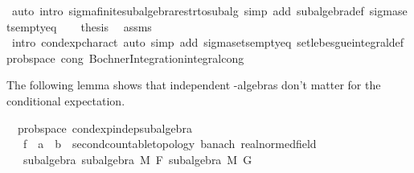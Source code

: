 \begin{isabellebody}
\ {\isacharparenleft}{\kern0pt}auto\ intro{\isacharcolon}{\kern0pt}\ sigma{\isacharunderscore}{\kern0pt}finite{\isacharunderscore}{\kern0pt}subalgebra{\isacharunderscore}{\kern0pt}restr{\isacharunderscore}{\kern0pt}to{\isacharunderscore}{\kern0pt}subalg\ simp\ add{\isacharcolon}{\kern0pt}\ subalgebra{\isacharunderscore}{\kern0pt}def\ sigma{\isacharunderscore}{\kern0pt}sets{\isacharunderscore}{\kern0pt}empty{\isacharunderscore}{\kern0pt}eq{\isacharparenright}{\kern0pt}\isanewline
\ \ \isamarkupfalse%
\ {\isacharquery}{\kern0pt}thesis\ \isamarkupfalse%
\ assms\ \isamarkupfalse%
\ {\isacharparenleft}{\kern0pt}intro\ cond{\isacharunderscore}{\kern0pt}exp{\isacharunderscore}{\kern0pt}charact{\isacharparenright}{\kern0pt}\ {\isacharparenleft}{\kern0pt}auto\ simp\ add{\isacharcolon}{\kern0pt}\ sigma{\isacharunderscore}{\kern0pt}sets{\isacharunderscore}{\kern0pt}empty{\isacharunderscore}{\kern0pt}eq\ set{\isacharunderscore}{\kern0pt}lebesgue{\isacharunderscore}{\kern0pt}integral{\isacharunderscore}{\kern0pt}def\ prob{\isacharunderscore}{\kern0pt}space\ cong{\isacharcolon}{\kern0pt}\ Bochner{\isacharunderscore}{\kern0pt}Integration{\isachardot}{\kern0pt}integral{\isacharunderscore}{\kern0pt}cong{\isacharparenright}{\kern0pt}\isanewline
{}\isamarkupfalse%
%
\endisatagproof
{\isafoldproof}%
%
\isadelimproof
%
\endisadelimproof
%
\begin{isamarkuptext}%
The following lemma shows that independent \isa{{\isasymsigma}}-algebras don't matter for the conditional expectation.%
\end{isamarkuptext}\isamarkuptrue%
\isamarkupfalse%
\ {\isacharparenleft}{\kern0pt}\ prob{\isacharunderscore}{\kern0pt}space{\isacharparenright}{\kern0pt}\ cond{\isacharunderscore}{\kern0pt}exp{\isacharunderscore}{\kern0pt}indep{\isacharunderscore}{\kern0pt}subalgebra{\isacharcolon}{\kern0pt}\isanewline
\ \ \ f\ {\isacharcolon}{\kern0pt}{\isacharcolon}{\kern0pt}\ {\isachardoublequoteopen}{\isacharprime}{\kern0pt}a\ {\isasymRightarrow}\ {\isacharprime}{\kern0pt}b\ {\isacharcolon}{\kern0pt}{\isacharcolon}{\kern0pt}\ {\isacharbraceleft}{\kern0pt}second{\isacharunderscore}{\kern0pt}countable{\isacharunderscore}{\kern0pt}topology{\isacharcomma}{\kern0pt}\ banach{\isacharcomma}{\kern0pt}\ real{\isacharunderscore}{\kern0pt}normed{\isacharunderscore}{\kern0pt}field{\isacharbraceright}{\kern0pt}{\isachardoublequoteclose}\isanewline
\ \ \ subalgebra{\isacharcolon}{\kern0pt}\ {\isachardoublequoteopen}subalgebra\ M\ F{\isachardoublequoteclose}\ {\isachardoublequoteopen}subalgebra\ M\ G{\isachardoublequoteclose}\isanewline

\end{isabellebody}
